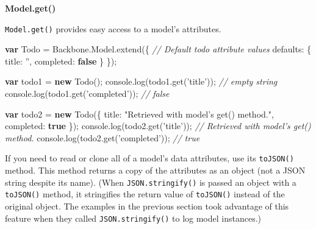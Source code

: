 \documentclass[9pt]{book}
\newenvironment{Shaded}{}{}
\newcommand{\KeywordTok}[1]{\textcolor[rgb]{0.00,0.44,0.13}{\textbf{{#1}}}}
\newcommand{\DataTypeTok}[1]{\textcolor[rgb]{0.56,0.13,0.00}{{#1}}}
\newcommand{\StringTok}[1]{\textcolor[rgb]{0.25,0.44,0.63}{{#1}}}
\newcommand{\CommentTok}[1]{\textcolor[rgb]{0.38,0.63,0.69}{\textit{{#1}}}}
\newcommand{\OtherTok}[1]{\textcolor[rgb]{0.00,0.44,0.13}{{#1}}}
\newcommand{\FunctionTok}[1]{\textcolor[rgb]{0.02,0.16,0.49}{{#1}}}
\newcommand{\NormalTok}[1]{{#1}}
\begin{document}
\textbf{Model.get()}

\texttt{Model.get()} provides easy access to a model's attributes.

\begin{Shaded}
\begin{Highlighting}[]
\KeywordTok{var} \NormalTok{Todo = }\OtherTok{Backbone}\NormalTok{.}\OtherTok{Model}\NormalTok{.}\FunctionTok{extend}\NormalTok{(\{}
  \CommentTok{// Default todo attribute values}
  \DataTypeTok{defaults}\NormalTok{: \{}
    \DataTypeTok{title}\NormalTok{: }\StringTok{''}\NormalTok{,}
    \DataTypeTok{completed}\NormalTok{: }\KeywordTok{false}
  \NormalTok{\}}
\NormalTok{\});}

\KeywordTok{var} \NormalTok{todo1 = }\KeywordTok{new} \FunctionTok{Todo}\NormalTok{();}
\OtherTok{console}\NormalTok{.}\FunctionTok{log}\NormalTok{(}\OtherTok{todo1}\NormalTok{.}\FunctionTok{get}\NormalTok{(}\StringTok{'title'}\NormalTok{)); }\CommentTok{// empty string}
\OtherTok{console}\NormalTok{.}\FunctionTok{log}\NormalTok{(}\OtherTok{todo1}\NormalTok{.}\FunctionTok{get}\NormalTok{(}\StringTok{'completed'}\NormalTok{)); }\CommentTok{// false}

\KeywordTok{var} \NormalTok{todo2 = }\KeywordTok{new} \FunctionTok{Todo}\NormalTok{(\{}
  \DataTypeTok{title}\NormalTok{: }\StringTok{"Retrieved with model's get() method."}\NormalTok{,}
  \DataTypeTok{completed}\NormalTok{: }\KeywordTok{true}
\NormalTok{\});}
\OtherTok{console}\NormalTok{.}\FunctionTok{log}\NormalTok{(}\OtherTok{todo2}\NormalTok{.}\FunctionTok{get}\NormalTok{(}\StringTok{'title'}\NormalTok{)); }\CommentTok{// Retrieved with model's get() method.}
\OtherTok{console}\NormalTok{.}\FunctionTok{log}\NormalTok{(}\OtherTok{todo2}\NormalTok{.}\FunctionTok{get}\NormalTok{(}\StringTok{'completed'}\NormalTok{)); }\CommentTok{// true}
\end{Highlighting}
\end{Shaded}

If you need to read or clone all of a model's data attributes, use its
\texttt{toJSON()} method. This method returns a copy of the attributes
as an object (not a JSON string despite its name). (When
\texttt{JSON.stringify()} is passed an object with a \texttt{toJSON()}
method, it stringifies the return value of \texttt{toJSON()} instead of
the original object. The examples in the previous section took advantage
of this feature when they called \texttt{JSON.stringify()} to log model
instances.)
\end{document}
